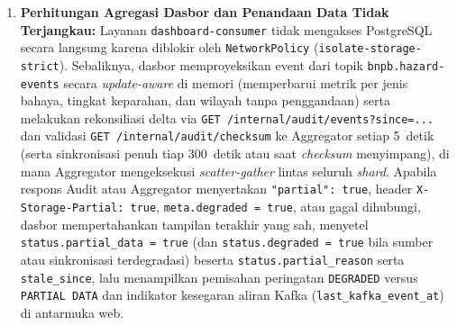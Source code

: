 \begin{enumerate}
\begin{itemize}
        \item \texttt{GET /internal/audit/events}, \texttt{/checksum}, \texttt{/location}, dan \texttt{/unprocessed}: Pada kondisi normal menjamin pengurutan deterministik \texttt{(ingested\_at ASC, hazard\_id ASC)} dan \textit{checksum} SHA-256 \textit{byte-exact} terhadap seluruh unit primer. Saat satu node mati, jawaban tetap lengkap melalui replika. Bila sebagian unit tidak terjangkau, \texttt{/events}, \texttt{/checksum}, dan \texttt{/unprocessed} tetap mengembalikan HTTP~200 disertai \texttt{"partial": true} dan \texttt{unavailable\_units}, sedangkan \texttt{/location} mengembalikan \texttt{503} (bukan \texttt{404} palsu) apabila \textit{shard} pemilik tidak dapat dihubungi agar tidak keliru menyimpulkan rekaman hilang.
        \item \textbf{Dasbor Analitik (\texttt{GET /dashboard}, \texttt{GET /api/analytics}):} Menjamin \textit{near real-time eventual consistency} melalui proyeksi Kafka yang diselaraskan secara berkala terhadap Audit API; pada kondisi gangguan parsial, menyajikan \textit{snapshot} terakhir dengan penanda eksplisit \texttt{"partial\_data": true}.
    \end{itemize}
    \item \textbf{Perhitungan Agregasi Dasbor dan Penandaan Data Tidak Terjangkau:} Layanan \texttt{dashboard-consumer} tidak mengakses PostgreSQL secara langsung karena diblokir oleh \texttt{NetworkPolicy} (\texttt{isolate-storage-strict}). Sebaliknya, dasbor memproyeksikan event dari topik \texttt{bnpb.hazard-events} secara \textit{update-aware} di memori (memperbarui metrik per jenis bahaya, tingkat keparahan, dan wilayah tanpa penggandaan) serta melakukan rekonsiliasi delta via \texttt{GET /internal/audit/events?since=...} dan validasi \texttt{GET /internal/audit/checksum} ke Aggregator setiap 5~detik (serta sinkronisasi penuh tiap 300~detik atau saat \textit{checksum} menyimpang), di mana Aggregator mengeksekusi \textit{scatter-gather} lintas seluruh \textit{shard}. Apabila respons Audit atau Aggregator menyertakan \texttt{"partial": true}, header \texttt{X-Storage-Partial: true}, \texttt{meta.degraded = true}, atau gagal dihubungi, dasbor mempertahankan tampilan terakhir yang sah, menyetel \texttt{status.\allowbreak partial\_\allowbreak data = true} (dan \texttt{status.degraded = true} bila sumber atau sinkronisasi terdegradasi) beserta \texttt{status.\allowbreak partial\_\allowbreak reason} serta \texttt{stale\_\allowbreak since}, lalu menampilkan pemisahan peringatan \texttt{DEGRADED} versus \texttt{PARTIAL DATA} dan indikator kesegaran aliran Kafka (\texttt{last\_\allowbreak kafka\_\allowbreak event\_at}) di antarmuka web.
\end{enumerate}

